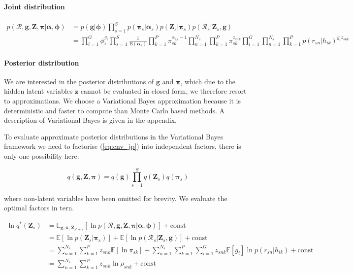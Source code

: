 \documentclass{article}
\begin{document}
\paragraph{Joint distribution}

\begin{align}
\label{eq:cnv_jp}
 p(\mathcal{R}, \boldsymbol{g}, \boldsymbol{Z}, \boldsymbol{\pi} | \boldsymbol{\alpha}, \boldsymbol{\phi}) &= p(\boldsymbol{g} | \boldsymbol{\phi}) \prod_{s = 1}^S p(\boldsymbol{\pi}_s | \boldsymbol{\alpha}_s) p(\boldsymbol{Z}_s | \boldsymbol{\pi}_s) p(\mathcal{R}_s | \boldsymbol{Z}_s, \boldsymbol{g}) \\
 &= \prod^G_{i = 1} \phi_i^{g_i} \prod_{s = 1}^S \frac{1}{\text{B}(\boldsymbol{\alpha}_s)} \prod_{k = 1}^P \pi_{sk}^{\alpha_{sk} - 1} \prod_{n = 1}^{N_s} \prod_{k = 1}^P \pi_{sk}^{z_{snk}} \prod^G_{i = 1} \prod_{n = 1}^{N_s} \prod_{k = 1}^P p(r_{sn} | h_{ik})^{g_i z_{snk}}
\end{align}

\paragraph{Posterior distribution}

We are interested in the posterior distributions of $\boldsymbol{g}$ and $\boldsymbol{\pi}$, which due to the hidden latent variables $\boldsymbol{z}$ cannot be evaluated in closed form, we therefore resort to approximations. We choose a Variational Bayes approximation because it is deterministic and faster to compute than Monte Carlo based methods. A description of Variational Bayes is given in the appendix.

To evaluate approximate posterior distributions in the Variational Bayes framework we need to factorise (\ref{eq:cnv_jp}) into independent factors, there is only one possibility here:

\begin{equation}
\label{eq:cnv_vb_factors}
    q(\boldsymbol{g}, \boldsymbol{Z}, \boldsymbol{\pi}) = q(\boldsymbol{g}) \prod_{s = 1}^S q(\boldsymbol{Z}_s) q(\boldsymbol{\pi}_s)
\end{equation}

where non-latent variables have been omitted for brevity. We evaluate the optimal factors in tern.

\begin{align}
\label{eq:cnv_ln_q_z}
\ln q^*(\boldsymbol{Z}_s) &= \mathbb{E}_{\boldsymbol{g}, \boldsymbol{\pi}, \boldsymbol{Z}_{s' \ne s}} [\ln p(\mathcal{R}, \boldsymbol{g}, \boldsymbol{Z}, \boldsymbol{\pi} | \boldsymbol{\alpha}, \boldsymbol{\phi})] + \text{const} \\
&= \mathbb{E}[\ln p(\boldsymbol{Z}_s | \boldsymbol{\pi}_s)] + \mathbb{E}[\ln p(\mathcal{R}_s | \boldsymbol{Z}_s, \boldsymbol{g})] + \text{const} \\
&= \sum_{n = 1}^{N_s} \sum_{k = 1}^P z_{snk} \mathbb{E}[\ln \pi_{sk}] + \sum_{n = 1}^{N_s} \sum_{k = 1}^P \sum_{i = 1}^G z_{snk} \mathbb{E}[g_i] \ln p(r_{sn} | h_{ik}) + \text{const} \\
&= \sum_{n = 1}^{N_s} \sum_{k = 1}^P z_{snk} \ln \rho_{snk} + \text{const}
\end{align}
\end{document}
